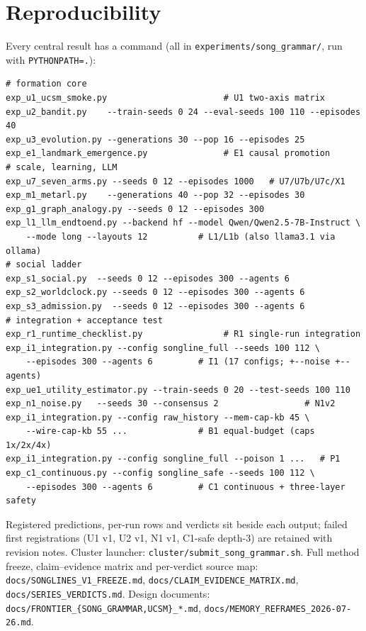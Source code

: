 \documentclass{article}
\begin{document}
\section{Reproducibility}
\label{p5:app:repro}
Every central result has a command (all in
\texttt{experiments/song\_grammar/}, run with \texttt{PYTHONPATH=.}):
\begin{verbatim}
# formation core
exp_u1_ucsm_smoke.py                       # U1 two-axis matrix
exp_u2_bandit.py    --train-seeds 0 24 --eval-seeds 100 110 --episodes 40
exp_u3_evolution.py --generations 30 --pop 16 --episodes 25
exp_e1_landmark_emergence.py               # E1 causal promotion
# scale, learning, LLM
exp_u7_seven_arms.py --seeds 0 12 --episodes 1000   # U7/U7b/U7c/X1
exp_m1_metarl.py    --generations 40 --pop 32 --episodes 30
exp_g1_graph_analogy.py --seeds 0 12 --episodes 300
exp_l1_llm_endtoend.py --backend hf --model Qwen/Qwen2.5-7B-Instruct \
    --mode long --layouts 12          # L1/L1b (also llama3.1 via ollama)
# social ladder
exp_s1_social.py  --seeds 0 12 --episodes 300 --agents 6
exp_s2_worldclock.py --seeds 0 12 --episodes 300 --agents 6
exp_s3_admission.py  --seeds 0 12 --episodes 300 --agents 6
# integration + acceptance test
exp_r1_runtime_checklist.py                # R1 single-run integration
exp_i1_integration.py --config songline_full --seeds 100 112 \
    --episodes 300 --agents 6         # I1 (17 configs; +--noise +--agents)
exp_ue1_utility_estimator.py --train-seeds 0 20 --test-seeds 100 110
exp_n1_noise.py   --seeds 30 --consensus 2                 # N1v2
exp_i1_integration.py --config raw_history --mem-cap-kb 45 \
    --wire-cap-kb 55 ...              # B1 equal-budget (caps 1x/2x/4x)
exp_i1_integration.py --config songline_full --poison 1 ...   # P1
exp_c1_continuous.py --config songline_safe --seeds 100 112 \
    --episodes 300 --agents 6         # C1 continuous + three-layer safety
\end{verbatim}
Registered predictions, per-run rows and verdicts sit beside each
output; failed first registrations (U1 v1, U2 v1, N1 v1, C1-safe
depth-3) are retained with revision notes. Cluster launcher:
\texttt{cluster/submit\_song\_grammar.sh}. Full method freeze,
claim--evidence matrix and per-verdict source map:
\texttt{docs/SONGLINES\_V1\_FREEZE.md},
\texttt{docs/CLAIM\_EVIDENCE\_MATRIX.md},
\texttt{docs/SERIES\_VERDICTS.md}. Design documents:
\texttt{docs/FRONTIER\_\{SONG\_GRAMMAR,UCSM\}\_*.md},
\texttt{docs/MEMORY\_REFRAMES\_2026-07-26.md}.
\FloatBarrier
\end{document}
